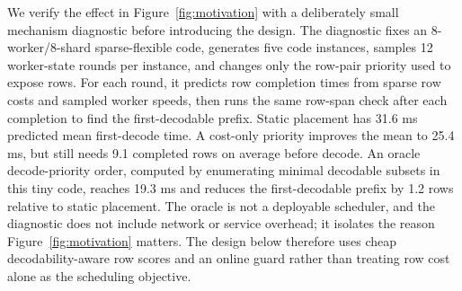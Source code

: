 We verify the effect in Figure~\ref{fig:motivation} with a deliberately small
mechanism diagnostic before introducing the design.  The diagnostic fixes an
8-worker/8-shard sparse-flexible code, generates five code instances, samples
12 worker-state rounds per instance, and changes only the row-pair priority
used to expose rows.  For each round, it predicts row completion times from
sparse row costs and sampled worker speeds, then runs the same row-span check
after each completion to find the first-decodable prefix.  Static placement has
31.6 ms predicted mean first-decode time.  A cost-only priority improves the
mean to 25.4 ms, but still needs 9.1 completed rows on average before decode.
An oracle decode-priority order, computed by enumerating minimal decodable
subsets in this tiny code, reaches 19.3 ms and reduces the first-decodable
prefix by 1.2 rows relative to static placement.  The oracle is not a deployable
scheduler, and the diagnostic does not include network or service overhead; it
isolates the reason Figure~\ref{fig:motivation} matters.  The design below
therefore uses cheap decodability-aware row scores and an online guard rather
than treating row cost alone as the scheduling objective.
